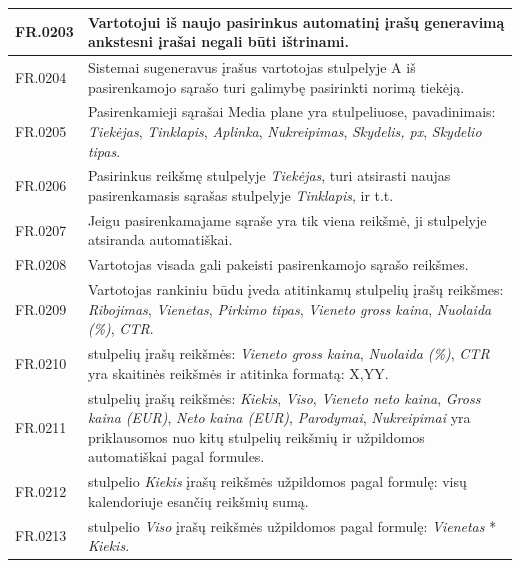 {\begin{longtable}{|L{2cm}|L{13.5cm}|}
FR.0203 &
Vartotojui iš naujo pasirinkus automatinį įrašų generavimą ankstesni įrašai negali būti ištrinami.
\\ \hline  

FR.0204 &
Sistemai sugeneravus įrašus vartotojas stulpelyje A iš pasirenkamojo sąrašo turi galimybę pasirinkti norimą tiekėją.
\\ \hline  
  
FR.0205 &
Pasirenkamieji sąrašai Media plane yra stulpeliuose, pavadinimais: \textit{Tiekėjas}, \textit{Tinklapis}, \textit{Aplinka}, \textit{Nukreipimas}, \textit{Skydelis, px}, \textit{Skydelio tipas}.
\\ \hline 
  
FR.0206 &
Pasirinkus reikšmę stulpelyje \textit{Tiekėjas}, turi atsirasti naujas pasirenkamasis sąrašas stulpelyje \textit{Tinklapis}, ir t.t.
\\ \hline  

FR.0207 &
Jeigu pasirenkamajame sąraše yra tik viena reikšmė, ji stulpelyje atsiranda automatiškai.
\\ \hline  
  
FR.0208 &
Vartotojas visada gali pakeisti pasirenkamojo sąrašo reikšmes.
\\ \hline  
  
FR.0209 &
Vartotojas rankiniu būdu įveda atitinkamų stulpelių įrašų reikšmes: \textit{Ribojimas}, \textit{Vienetas}, \textit{Pirkimo tipas}, \textit{Vieneto gross kaina}, \textit{Nuolaida (\%)}, \textit{CTR}.
\\ \hline  
  
FR.0210 &
stulpelių įrašų reikšmės: \textit{Vieneto gross kaina}, \textit{Nuolaida (\%)}, \textit{CTR} yra skaitinės reikšmės ir atitinka formatą: X,YY.
\\ \hline  

FR.0211 &
stulpelių įrašų reikšmės: \textit{Kiekis}, \textit{Viso}, \textit{Vieneto neto kaina}, \textit{Gross kaina (EUR)}, \textit{Neto kaina (EUR)}, \textit{Parodymai}, \textit{Nukreipimai} yra priklausomos nuo kitų stulpelių reikšmių ir užpildomos automatiškai pagal formules.
\\ \hline  
  
FR.0212 &
stulpelio \textit{Kiekis} įrašų reikšmės užpildomos pagal formulę: visų kalendoriuje esančių reikšmių sumą.
\\ \hline    
  
FR.0213 &
stulpelio \textit{Viso} įrašų reikšmės užpildomos pagal formulę: \textit{Vienetas} * \textit{Kiekis}.
\\ \hline  
  

\end{longtable}}
